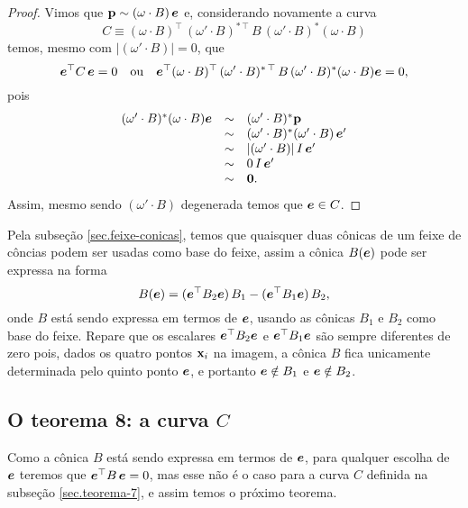 \begin{proof}
 
Vimos que ${\bf p}\sim (\omega\cdot B)\,\boldsymbol{e}$ e, considerando novamente a curva 
\begin{equation*}
C \equiv (\omega \cdot B)^\top\,(\omega' \cdot B)^{*\,\top}\,B\,(\omega' \cdot B)^*(\omega \cdot B)
\end{equation*}                                      
temos, mesmo com  $|(\omega' \cdot B)|=0$, que
\begin{equation*}
\boldsymbol{e}^\top C\,\boldsymbol{e}=0\quad\text{ou}\quad
\boldsymbol{e}^\top (\omega \cdot B)^\top\,(\omega' \cdot B)^{*\,\top}\,B\,(\omega' \cdot B)^*(\omega \cdot B)\boldsymbol{e}=0,
\end{equation*}                                                pois
\begin{equation*}
\begin{array}{rcl}
(\omega' \cdot B)^*(\omega \cdot B)\boldsymbol{e}&\sim &(\omega' \cdot B)^*{\bf p}\\
&\sim &(\omega' \cdot B)^*(\omega'\cdot B)\,\boldsymbol{e}'\\
&\sim&|(\omega' \cdot B)|\,I\,\boldsymbol{e}'\\
&\sim&0\,I\,\boldsymbol{e}'\\
&\sim&{\bf 0}.
\end{array}
\end{equation*}
Assim, mesmo sendo $(\omega' \cdot B)$ degenerada temos que $\boldsymbol{e}\in C$.                                   
\end{proof}

Pela subseção \ref{sec.feixe-conicas}, temos que quaisquer duas cônicas de um feixe de côncias podem ser usadas como base do feixe, assim a cônica $B(\boldsymbol{e})$ pode ser expressa na forma
\begin{equation*}
B(\boldsymbol{e})=(\boldsymbol{e}^\top B_2\boldsymbol{e})\,B_1-(\boldsymbol{e}^\top B_1\boldsymbol{e})\,B_2,
\end{equation*} 
onde $B$ está sendo expressa em termos de $\boldsymbol{e}$, usando as cônicas $B_1$ e $B_2$ como base do feixe. Repare que os escalares $\boldsymbol{e}^\top B_2\boldsymbol{e}$ e $\boldsymbol{e}^\top B_1\boldsymbol{e}$ são sempre diferentes de zero pois, dados os quatro pontos $\mathbf{x}_i$ na imagem, a cônica $B$ fica unicamente determinada pelo quinto ponto $\boldsymbol{e}$, e portanto $\boldsymbol{e}\notin B_1$ e $\boldsymbol{e}\notin B_2$.


\subsection{O teorema 8: a curva $C$}
Como a cônica $B$ está sendo expressa em termos de $\boldsymbol{e}$, para qualquer escolha de $\boldsymbol{e}$ teremos que $\boldsymbol{e}^\top B\,\boldsymbol{e}=0$, mas esse não é o caso para a curva $C$ definida na subseção \ref{sec.teorema-7}, e assim temos o próximo teorema.


